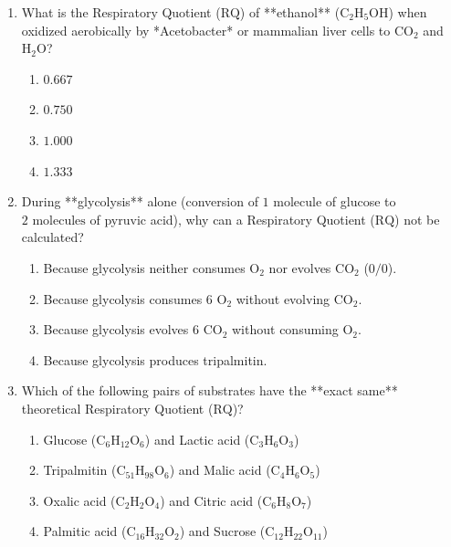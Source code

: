 \documentclass[11pt, a4paper]{article}
\begin{document}
\begin{enumerate}[label=\textbf{\arabic*.}]
\item What is the Respiratory Quotient ($\text{RQ}$) of **ethanol** ($\text{C}_2\text{H}_5\text{OH}$) when oxidized aerobically by *Acetobacter* or mammalian liver cells to $\text{CO}_2$ and $\text{H}_2\text{O}$?
\begin{enumerate}[label=(\Alph*)]
    \item $0.667$
    \item $0.750$
    \item $1.000$
    \item $1.333$
\end{enumerate}

\item During **glycolysis** alone (conversion of $1\text{ molecule}$ of glucose to $2\text{ molecules}$ of pyruvic acid), why can a Respiratory Quotient ($\text{RQ}$) not be calculated?
\begin{enumerate}[label=(\Alph*)]
    \item Because glycolysis neither consumes $\text{O}_2$ nor evolves $\text{CO}_2$ ($0 / 0$).
    \item Because glycolysis consumes $6\text{ O}_2$ without evolving $\text{CO}_2$.
    \item Because glycolysis evolves $6\text{ CO}_2$ without consuming $\text{O}_2$.
    \item Because glycolysis produces tripalmitin.
\end{enumerate}

\item Which of the following pairs of substrates have the **exact same** theoretical Respiratory Quotient ($\text{RQ}$)?
\begin{enumerate}[label=(\Alph*)]
    \item Glucose ($\text{C}_6\text{H}_{12}\text{O}_6$) and Lactic acid ($\text{C}_3\text{H}_6\text{O}_3$)
    \item Tripalmitin ($\text{C}_{51}\text{H}_{98}\text{O}_6$) and Malic acid ($\text{C}_4\text{H}_6\text{O}_5$)
    \item Oxalic acid ($\text{C}_2\text{H}_2\text{O}_4$) and Citric acid ($\text{C}_6\text{H}_8\text{O}_7$)
    \item Palmitic acid ($\text{C}_{16}\text{H}_{32}\text{O}_2$) and Sucrose ($\text{C}_{12}\text{H}_{22}\text{O}_{11}$)
\end{enumerate}


\end{enumerate}
\end{document}
